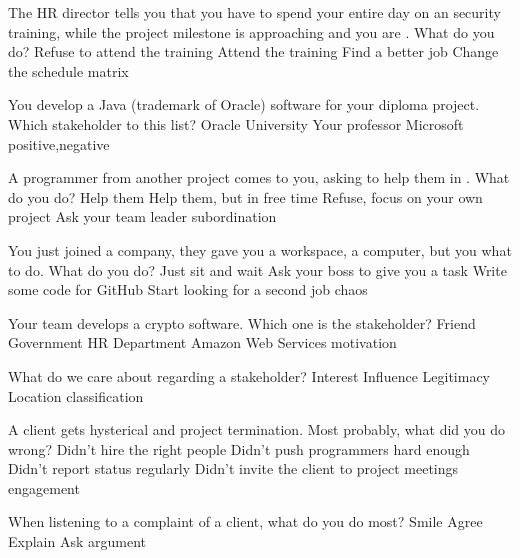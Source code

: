 \documentclass{article}
\begin{document}

\pmbaQuestion
  {The HR director tells you that you have to spend your entire day on an  security training, while the project milestone is approaching and you are . What do you do?}
  {Refuse to attend the training}
  {Attend the training}
  {Find a better job}
  {Change the schedule}
  {matrix}

\pmbaQuestion
  {You develop a Java (trademark of Oracle) software for your diploma project. Which stakeholder  to this list?}
  {Oracle}
  {University}
  {Your professor}
  {Microsoft}
  {positive,negative}

\pmbaQuestion
  {A programmer from another project comes to you, asking to help them in . What do you do?}
  {Help them}
  {Help them, but in free time}
  {Refuse, focus on your own project}
  {Ask your team leader}
  {subordination}

\pmbaQuestion
  {You just joined a company, they gave you a workspace, a computer, but  you what to do. What do you do?}
  {Just sit and wait}
  {Ask your boss to give you a task}
  {Write some code for GitHub}
  {Start looking for a second job}
  {chaos}

\pmbaQuestion
  {Your team develops a crypto software. Which one is the  stakeholder?}
  {Friend}
  {Government}
  {HR Department}
  {Amazon Web Services}
  {motivation}

\pmbaQuestion
  {What do we care  about regarding a stakeholder?}
  {Interest}
  {Influence}
  {Legitimacy}
  {Location}
  {classification}

\pmbaQuestion
  {A client gets hysterical and  project termination. Most probably, what did you do wrong?}
  {Didn't hire the right people}
  {Didn't push programmers hard enough}
  {Didn't report status regularly}
  {Didn't invite the client to project meetings}
  {engagement}

\pmbaQuestion
  {When  listening to a complaint of a client, what do you do most?}
  {Smile}
  {Agree}
  {Explain}
  {Ask}
  {argument}


\end{document}
